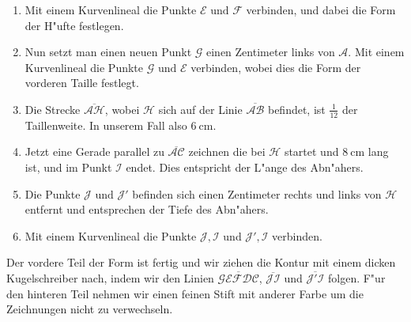 \documentclass{scrartcl}
\begin{document}
\begin{enumerate}
  \item Mit einem Kurvenlineal die Punkte $\mathcal{E}\text{ und }
      \mathcal{F}$ verbinden, und dabei die Form der H"ufte festlegen.
 
  \item Nun setzt man einen neuen Punkt $\mathcal{G}$ einen Zentimeter links
      von $\mathcal{A}$. Mit einem Kurvenlineal die Punkte
      $\mathcal{G}\text{ und }\mathcal{E}$ verbinden, wobei dies die Form der
      vorderen Taille festlegt.

    \item Die Strecke $\overline{\mathcal{AH}}$, wobei $\mathcal{H}$ sich auf 
      der Linie $\overline{\mathcal{AB}}$ befindet, ist $\frac{1}{12}$ der
    Taillenweite. In unserem Fall also $\SI{6}{\centi\meter}$. 

  \item Jetzt eine Gerade parallel zu $\overline{\mathcal{AC}}$ zeichnen die
      bei $\mathcal{H}$ startet und $\SI{8}{\centi\meter}$ lang ist, und im 
      Punkt $\mathcal{I}$ endet. Dies entspricht der L"ange des Abn"ahers.

  \item Die Punkte $\mathcal{J}\text{ und }\mathcal{J'}$ befinden sich einen 
      Zentimeter rechts und links von $\mathcal{H}$ entfernt und entsprechen der 
      Tiefe des Abn"ahers. 
     
  \item Mit einem Kurvenlineal die Punkte $\mathcal{J,I}$ und $\mathcal{J',I}$
      verbinden.

\end{enumerate}


    \noindent Der vordere Teil der Form ist fertig und wir ziehen die Kontur mit
    einem dicken Kugelschreiber nach, indem wir den Linien
    $\overline{\mathcal{GEFDC}}$, $\overline{\mathcal{JI}}$ und 
    $\overline{\mathcal{J'I}}$ folgen. 
    F"ur den hinteren Teil nehmen wir einen feinen Stift mit anderer Farbe
    um die Zeichnungen nicht zu verwechseln.
\end{document}
